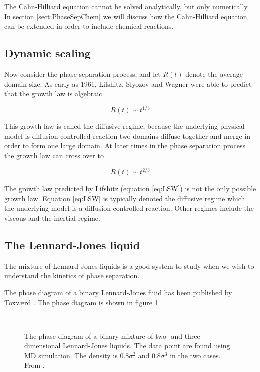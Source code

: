 The Cahn-Hilliard equation cannot be solved analytically, but only
numerically. In section \ref{sect:PhaseSepChem} we will discuss how the
Cahn-Hilliard equation can be extended in order to include chemical
reactions.


\subsection{Dynamic scaling}
Now consider the phase separation process, and let $R(t)$ denote the
average domain size. As early as 1961, Lifshitz, Slyozov and Wagner
were able to predict that the growth law is algebraic \cite{Bray94} \ie

\begin{equation}
\label{eq:LSW}
  R(t) \sim t^{1/3}
\end{equation}

This growth law is called the diffusive regime, because the underlying
physical model is diffusion-controlled reaction \ie two domains diffuse
together and merge in order to form one large domain. At later times in
the phase separation process the growth law can cross over to
\cite{Bray94}

\begin{equation}
  R(t) \sim t^{2/3}
\end{equation}

The growth law predicted by Lifshitz \etal (equation \eqref{eq:LSW}) is
not the only possible growth law. Equation \eqref{eq:LSW} is typically
denoted the diffusive regime which the underlying model is a
diffusion-controlled reaction. Other regimes include the viscous and
the inertial regime.


\subsection{The Lennard-Jones liquid}
The mixture of Lennard-Jones liquids is a good system to study when we
wish to understand the kinetics of phase separation.

The phase diagram of a binary Lennard-Jones fluid has been published by
Toxv{\ae}rd \etal \cite{Toxvaerd95a, Velasco93}. The phase diagram is
shown in figure \ref{fig:PhaseLJmix}

\begin{figure}
    \mbox{\subfigure[2 dimensions]{} \quad
          \subfigure[3 dimensions]{}}
  \caption[Phase diagram of LJ mixture]{The phase diagram of a binary
  mixture of two- and three-dimensional Lennard-Jones liquids. The data
  point are found using MD simulation. The density is
  $0.8\sigma^2$ and $0.8\sigma^3$ in the two cases.
  From \cite{Toxvaerd95a}.\label{fig:PhaseLJmix}}
\end{figure}

